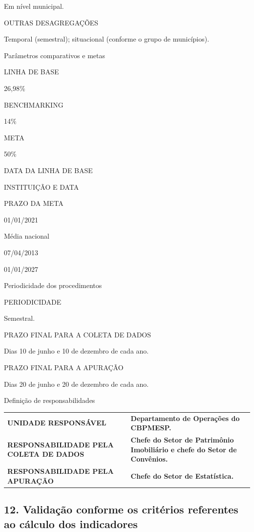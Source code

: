 \documentclass[
  letterpaper,
  DIV=11,
  numbers=noendperiod]{scrreprt}
\begin{document}
Em nível municipal.

OUTRAS DESAGREGAÇÕES

Temporal (semestral); situacional (conforme o grupo de municípios).

Parâmetros comparativos e metas

LINHA DE BASE

26,98\%

BENCHMARKING

14\%

META

50\%

DATA DA LINHA DE BASE

INSTITUIÇÃO E DATA

PRAZO DA META

01/01/2021

Média nacional

07/04/2013

01/01/2027

Periodicidade dos procedimentos

PERIODICIDADE

Semestral.

PRAZO FINAL PARA A COLETA DE DADOS

Dias 10 de junho e 10 de dezembro de cada ano.

PRAZO FINAL PARA A APURAÇÃO

Dias 20 de junho e 20 de dezembro de cada ano.

Definição de responsabilidades

\begin{longtable}[]{@{}
  >{\raggedright\arraybackslash}p{}
  >{\raggedright\arraybackslash}p{}@{}}
\toprule\noalign{}
\endhead
\bottomrule\noalign{}
\endlastfoot
\textbf{UNIDADE RESPONSÁVEL} & \textbf{Departamento de Operações do
CBPMESP.} \\
\textbf{RESPONSABILIDADE PELA COLETA DE DADOS} & \textbf{Chefe do Setor
de Patrimônio Imobiliário e chefe do Setor de Convênios.} \\
\textbf{RESPONSABILIDADE PELA APURAÇÃO} & \textbf{Chefe do Setor de
Estatística.} \\
\end{longtable}

\hypertarget{validauxe7uxe3o-conforme-os-crituxe9rios-referentes-ao-cuxe1lculo-dos-indicadores}{%
\subsection*{12. Validação conforme os critérios referentes ao cálculo
dos
indicadores}\label{validauxe7uxe3o-conforme-os-crituxe9rios-referentes-ao-cuxe1lculo-dos-indicadores}}
\end{document}
